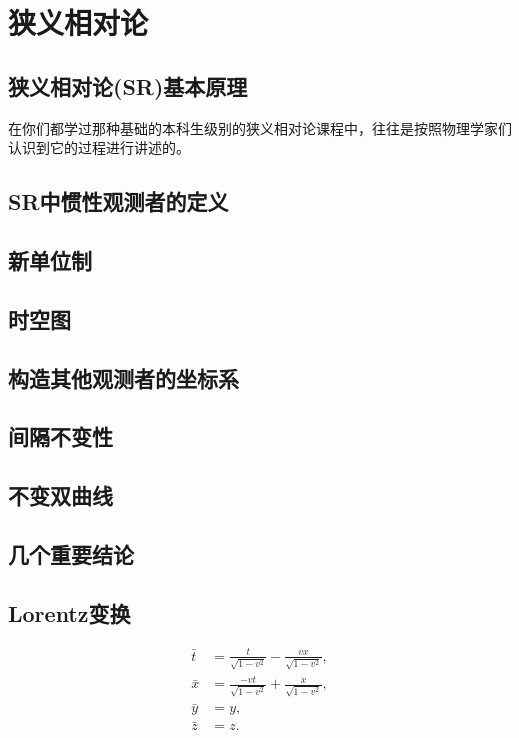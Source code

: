 

\chapter{狭义相对论}
\label{chap1}

\section{狭义相对论(SR)基本原理}
\label{sec1.1}

在你们都学过那种基础的本科生级别的狭义相对论课程中，往往是按照物理学家们认识到它的过程进行讲述的。

\section{SR中惯性观测者的定义}
\label{sec1.2}

\section{新单位制}
\label{sec1.3}

\section{时空图}
\label{sec1.4}

\section{构造其他观测者的坐标系}
\label{sec1.5}

\section{间隔不变性}
\label{sec1.6}

\section{不变双曲线}
\label{sec1.7}

\section{几个重要结论}
\label{sec1.8}

\section{Lorentz变换}
\label{sec1.9}
\begin{shaded}
\begin{equation}
\begin{split}
    \bar{t} &= \frac{t}{\sqrt{1 - v^2}} - \frac{vx}{\sqrt{1 - v^2}}, \\
    \bar{x} &= \frac{-vt}{\sqrt{1 - v^2}} + \frac{x}{\sqrt{1 - v^2}}, \\
    \bar{y} &= y, \\
    \bar{z} &= z.
\end{split}
\label{equ1.12}
\end{equation}
\end{shaded}


